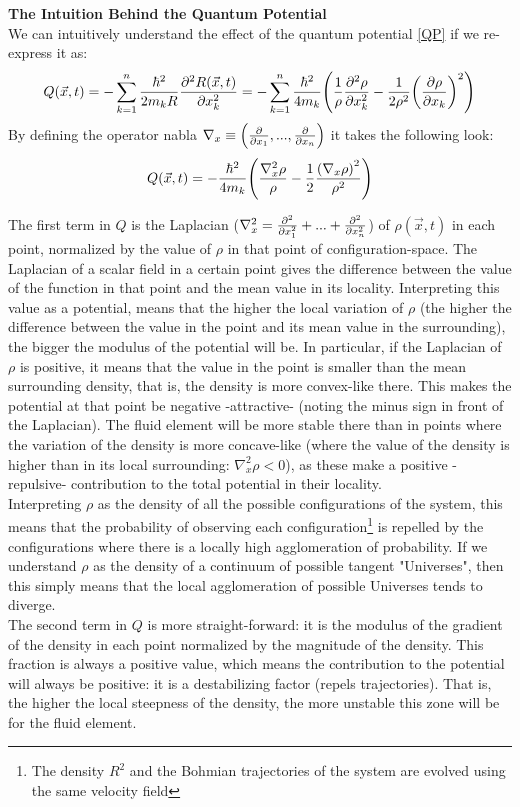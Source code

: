 \documentclass[11pt, a4paper]{article} %
\DeclareRobustCommand{\mybox}[2][gray!10]{%
\begin{tcolorbox}[   %
        left=0.2cm,
        right=0.2cm,
        top=0.15cm,
        bottom=0.15cm,
        colback=#1,
        colframe=#1,
        width=\dimexpr\textwidth\relax, 
        enlarge left by=0mm,
        boxsep=5pt,
        arc=0pt,outer arc=0pt,
        ]
        #2
\end{tcolorbox}
}
\begin{document}
\mybox{
{\bf The Intuition Behind the Quantum Potential\vspace{0.2cm}\\}
We can intuitively understand the effect of the quantum potential \eqref{QP} if we re-express it as:
$$
Q(\vec{x},t) = -\sum_{k=1}^n \frac{\hbar^2}{2m_k R}\pdv[2]{R(\vec{x}, t)}{x_k} =  -\sum_{k=1}^n \frac{\hbar^2}{4m_k} \qty(\frac{1}{\rho}\pdv[2]{\rho}{x_k} -\frac{1}{2\rho^2}\qty(\pdv{\rho}{x_k})^2)
$$
By defining the operator nabla $\nabla_x \equiv \qty(\pdv{}{x_1}, ... , \pdv{}{x_n})$ it takes the following look:
\begin{equation}\label{Q2}
Q(\vec{x},t) = -\frac{\hbar^2}{4m_k }\qty(\frac{\nabla_x^2\rho}{\rho} -\frac{1}{2}\frac{\qty(\nabla_x \rho)^2}{\rho^2})\vspace{-0.2cm}
\end{equation}
}
\mybox{
The first term in $Q$ is the Laplacian ($\nabla_x^2 = \pdv[2]{}{x_1}+...+\pdv[2]{}{x_n}$) of $\rho(\vec{x},t)$ in each point, normalized by the value of $\rho$ in that point of configuration-space. The Laplacian of a scalar field in a certain point gives the difference between the value of the function in that point and the mean value in its locality. Interpreting this value as a potential, means that the higher the local variation of $\rho$ (the higher the difference between the value in the point and its mean value in the surrounding), the bigger the modulus of the potential will be. In particular, if the Laplacian of $\rho$ is positive, it means that the value in the point is smaller than the mean surrounding density, that is, the density is more convex-like there. This makes the potential at that point be negative -attractive- (noting the minus sign in front of the Laplacian). The fluid element will be more stable there than in points where the variation of the density is more concave-like (where the value of the density is higher than in its local surrounding: $\nabla_x^2 \rho<0$), as these make a positive -repulsive- contribution to the total potential in their locality.\\

Interpreting $\rho$ as the density of all the possible configurations of the system, this means that the probability of observing each configuration\footnote{ The density $R^2$ and the Bohmian trajectories of the system are evolved using the same velocity field} is repelled by the configurations where there is a locally high agglomeration of probability. If we understand $\rho$ as the density of a continuum of possible tangent "Universes", then this simply means that the local agglomeration of possible Universes tends to diverge.\\

The second term in $Q$ is more straight-forward: it is the modulus of the gradient of the density in each point normalized by the magnitude of the density. This fraction is always a positive value, which means the contribution to the potential will always be positive: it is a destabilizing factor (repels trajectories). That is, the higher the local steepness of the density, the more unstable this zone will be for the fluid element.
}
\end{document}
